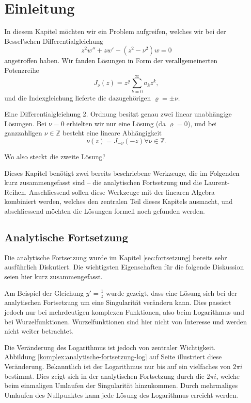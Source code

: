 \section{Einleitung}

In diesem Kapitel möchten wir ein Problem aufgreifen, welches wir bei der Bessel'schen Differentialgleichung
\[ z^2w''+zw'+(z^2 - \nu^2)w=0\]
angetroffen haben. 
Wir fanden Lösungen in Form der verallgemeinerten Potenzreihe
\[J_\nu(z)=z^\varrho\sum_{k=0}^{\infty}a_kz^k,\]
und die Indexgleichung lieferte die dazugehörigen $\varrho=\pm\nu.$

\begin{problem*} 
 Eine Differentialgleichung 2. Ordnung besitzt genau zwei linear unabhängige Lösungen.
 Bei $\nu=0$ erhielten wir nur eine Lösung (da $\varrho=0$), und bei ganzzahligen $\nu\in\mathbb{Z}$ besteht eine lineare Abhängigkeit
 \[\nu(z) = J_{-\nu}(-z)\forall\nu\in\mathbb{Z}.\]

Wo also steckt die zweite Lösung?
\end{problem*} 

Dieses Kapitel benötigt zwei bereits beschriebene Werkzeuge, die im Folgenden kurz zusammengefasst sind -- die analytischen Fortsetzung und die Laurent-Reihen.
Anschliessend sollen diese Werkzeuge mit der linearen Algebra kombiniert werden, welches den zentralen Teil dieses Kapitels ausmacht, und abschliessend möchten die Lösungen formell noch gefunden werden.

\subsection{Analytische Fortsetzung}
Die analytische Fortsetzung wurde im Kapitel \ref{sec:fortsetzung} bereits sehr ausführlich Diskutiert.
Die wichtigsten Eigenschaften für die folgende Diskussion seien hier kurz zusammengefasst.

Am Beispiel der Gleichung $y'=\frac{1}{z}$ wurde gezeigt, dass eine Lösung sich bei der analytischen Fortsetzung um eine Singularität verändern kann.
Dies passiert jedoch nur bei mehrdeutigen komplexen Funktionen, also beim Logarithmus und bei Wurzelfunktionen.
Wurzelfunktionen sind hier nicht von Interesse und werden nicht weiter betrachtet. 

Die Veränderung des Logarithmus ist jedoch von zentraler Wichtigkeit.
Abbildung \ref{komplex:analytische-fortsetzung-log} auf Seite \pageref{komplex:analytische-fortsetzung-log} illustriert diese Veränderung.
Bekanntlich ist der Logarithmus nur bis auf ein vielfaches von $2\pi i$ bestimmt. Dies zeigt sich in der analytischen Fortsetzung durch die $2\pi i$, welche beim einmaligen Umlaufen der Singularität hinzukommen.
Durch mehrmaliges Umlaufen des Nullpunktes kann jede Lösung des Logarithmus erreicht werden.

